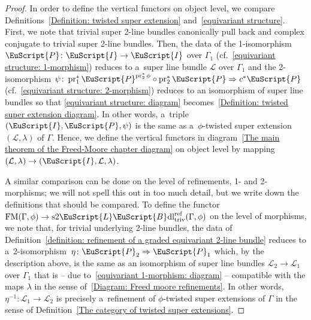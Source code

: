\documentclass[pdftex]{sigma}
\numberwithin{equation}{section}
\def\mathscr#1{\EuScript{#1}}
\newcommand{\LineBdl}{\mathscr{L}\mathscr{B}\mathrm{dl}}
\newcommand{\stwoLineBdltriv}{\mathrm{s}2\LineBdl_{\mathrm{triv}}}
\begin{document}
\begin{proof}
 In order to define the vertical functors on object level, we compare Definitions~\ref{Definition: twisted super extension} and~\ref{equivariant structure}.
 First, we note that trivial super 2-line bundles canonically pull back and complex conjugate to trivial super 2-line bundles.
 Then, the data of the 1-isomorphism $\mathscr{P} \colon \mathscr{I} \to \mathscr{I}$ over $\Gamma_1$ (cf.\ \eqref{equivariant structure: 1-morphism})
 reduces to a~super line bundle $\mathcal{L}$ over $\Gamma_1$
 and the 2-isomorphism $\psi\colon \operatorname{pr}_1^*\mathscr{P}^{\operatorname{pr}_2^*\phi} \circ \operatorname{pr}_2^*\mathscr{P}
 \Rightarrow c^*\mathscr{P}$ (cf.\ \eqref{equivariant structure: 2-morphism}) reduces to an isomorphism
  of super line bundles so that
 \eqref{equivariant structure: diagram} becomes~\eqref{Definition: twisted super extension diagram}. In other words, a~triple
 $(\mathscr{I},\mathscr{P},\psi)$ is the same as a~$\phi$-twisted super extension $(\mathcal{L},\lambda)$ of $\Gamma$. Hence, we define
 the vertical functors in diagram~\eqref{The main theorem of the Freed-Moore chapter diagram} on object level by mapping $(\mathcal{L},\lambda) \to (\mathscr{I},\mathcal{L},\lambda)$.

 A similar comparison can be done on the level of refinements, 1- and 2-morphisms; we will not spell this out in too much detail, but we write down the definitions
 that should be compared. To define the functor $\mathrm{FM}(\Gamma,\phi) \to \stwoLineBdltriv^{\mathrm{ref}}(\Gamma,\phi)$ on the level of morphisms, we note that, for trivial underlying 2-line bundles,
 the data of Definition~\ref{definition: refinement of a graded equivariant 2-line bundle} reduces to a~2-isomorphism~${\eta \colon \mathscr{P}_2 \Rightarrow \mathscr{P}_1}$
 which, by the description above, is the same as an isomorphism of super line bundles $\mathcal{L}_2 \to \mathcal{L}_1$ over $\Gamma_1$ that is -- due to~\eqref{equivariant 1-morphism: diagram} -- compatible
 with the maps $\lambda$ in the sense of~\eqref{Diagram: Freed moore refinements}.
 In other words, $\eta^{-1} \colon \mathcal{L}_1 \to \mathcal{L}_2$ is precisely a~refinement of $\phi$-twisted super extensions of $\Gamma$
 in the sense of Definition~\ref{The category of twisted super extensions}.


\end{proof}
\end{document}
